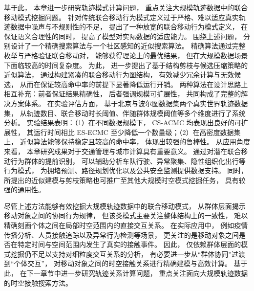 基于此， 本章进一步研究轨迹模式计算问题， 重点关注大规模轨迹数据中的联合移动模式挖掘问题。 针对传统联合移动行为模式定义过于严格、难以适应真实轨迹数据中噪声与不规则性的不足， 提出了一种放宽的联合移动行为模式定义， 在保证语义合理性的同时， 提高了模型对实际数据的适应能力。 围绕上述问题， 分别设计了一个精确搜索算法与一个社区感知的近似搜索算法。 精确算法通过完整枚举与严格验证联合移动对， 能够获得理论上的最优结果， 但在大规模数据场景下面临较高的时间复杂度。 为此， 进一步提出了基于结构剪枝与候选压缩策略的近似算法， 通过构建紧凑的联合移动行为图结构， 有效减少冗余计算与无效候选， 从而在保证较高命中率的前提下显著降低运行开销。 两种算法在设计思路上相互补充：前者保证结果精确性， 后者强调规模可扩展性， 共同构成了完整的解决方案体系。 在实验评估方面， 基于北京与波尔图数据集两个真实世界轨迹数据集， 从轨迹数目、联合移动时长阈值、伴随群体规模阈值等多个维度进行了系统分析。 实验结果表明：（1）在不同数据规模下， CS-ACMC 均表现出良好的可扩展性， 其运行时间相比 ES-ECMC 至少降低一个数量级；（2）在高密度数据集上， 近似算法能够保持稳定且较高的命中率， 体现出较强的鲁棒性。 从应用角度来看， 本章研究成果对于交通管理与城市计算具有重要意义。 通过对潜在联合移动行为群体的提前识别， 可以辅助分析车队行驶、异常聚集、隐性组织化出行等行为模式， 为拥堵预测、路径规划优化以及公共安全监测提供数据支持。 同时， 所提出的近似建模与剪枝策略也可推广至其他大规模时空模式挖掘任务， 具有较强的通用性。

尽管上述方法能够有效挖掘大规模轨迹数据中的联合移动模式， 从群体层面揭示移动对象之间的协同行为规律， 但该类模式主要关注整体结构上的一致性， 难以精确刻画个体之间在局部时空范围内的直接交互关系。 在实际应用中， 例如疫情传播分析、人员接触追踪以及异常行为检测等场景， 更关注的是移动对象之间是否在特定时间与空间范围内发生了真实的接触事件。 因此， 仅依赖群体层面的模式挖掘仍不足以支持对细粒度交互关系的分析， 有必要进一步从“群体协同”过渡到“个体交互”， 对移动对象之间的时空接触关系进行精确建模与高效计算。 基于此， 在下一章节中进一步研究轨迹关系计算问题， 重点关注面向大规模轨迹数据的时空接触搜索方法。
